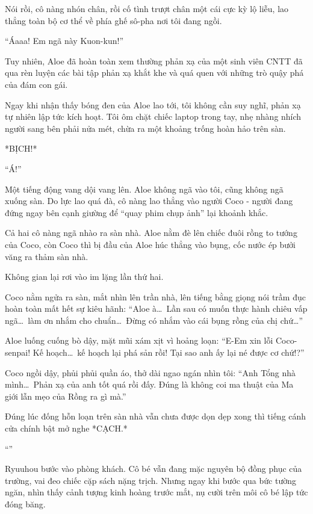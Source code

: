 \documentclass[../main.tex]{subfiles}
\begin{document}
Nói rồi, cô nàng nhón chân, rồi cố tình trượt chân một cái cực kỳ lộ liễu, lao thẳng toàn bộ cơ thể về phía ghế sô-pha nơi tôi đang ngồi.

``Áaaa! Em ngã này Kuon-kun!''

Tuy nhiên, Aloe đã hoàn toàn xem thường phản xạ của một sinh viên CNTT đã qua rèn luyện các bài tập phản xạ khắt khe và quá quen với những trò quậy phá của đám con gái.

Ngay khi nhận thấy bóng đen của Aloe lao tới, tôi không cần suy nghĩ, phản xạ tự nhiên lập tức kích hoạt. Tôi ôm chặt chiếc laptop trong tay, nhẹ nhàng nhích người sang bên phải nửa mét, chừa ra một khoảng trống hoàn hảo trên sàn.

*BỊCH!*

``Á!''

Một tiếng động vang dội vang lên. Aloe không ngã vào tôi, cũng không ngã xuống sàn. Do lực lao quá đà, cô nàng lao thẳng vào người Coco - người đang đứng ngay bên cạnh giường để ``quay phim chụp ảnh'' lại khoảnh khắc.

Cả hai cô nàng ngã nhào ra sàn nhà. Aloe nằm đè lên chiếc đuôi rồng to tướng của Coco, còn Coco thì bị đầu của Aloe húc thẳng vào bụng, cốc nước ép bưởi văng ra thảm sàn nhà.

Không gian lại rơi vào im lặng lần thứ hai.

Coco nằm ngửa ra sàn, mắt nhìn lên trần nhà, lên tiếng bằng giọng nói trầm đục hoàn toàn mất hết sự kiêu hãnh: ``Aloe à\dots\ Lần sau có muốn thực hành chiêu vấp ngã\dots\ làm ơn nhắm cho chuẩn\dots\ Đừng có nhắm vào cái bụng rồng của chị chứ\dots''

Aloe luống cuống bò dậy, mặt mũi xám xịt vì hoảng loạn: ``E-Em xin lỗi Coco-senpai! Kế hoạch\dots\ kế hoạch lại phá sản rồi! Tại sao anh ấy lại né được cơ chứ!?''

Coco ngồi dậy, phủi phủi quần áo, thở dài ngao ngán nhìn tôi: ``Anh Tổng nhà mình\dots\ Phản xạ của anh tốt quá rồi đấy. Đúng là không coi ma thuật của Ma giới lẫn mẹo của Rồng ra gì mà.''

\ct

Đúng lúc đống hỗn loạn trên sàn nhà vẫn chưa được dọn dẹp xong thì tiếng cánh cửa chính bật mở nghe *CẠCH.*

``''

Ryuuhou bước vào phòng khách. Cô bé vẫn đang mặc nguyên bộ đồng phục của trường, vai đeo chiếc cặp sách nặng trịch. Nhưng ngay khi bước qua bức tường ngăn, nhìn thấy cảnh tượng kinh hoàng trước mắt, nụ cười trên môi cô bé lập tức đóng băng.
\end{document}
